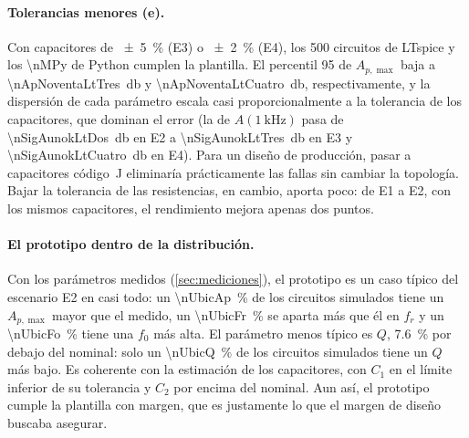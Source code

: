 \begin{table}[H]
  \centering\small
  \caption{Desviación estándar de los parámetros en el escenario E2 (R $\pm\qty{1}{\percent}$, C $\pm\qty{10}{\percent}$): predicción lineal
  (\cref{eq:sigma_lineal}), Monte Carlo de Python con \num{\nMPy} muestras y con los mismos 500 juegos de componentes de LTspice, y LTspice.
  Frecuencias y $Q$ en porcentaje del valor nominal.}
  \label{tab:mc_dispersion}
\end{table}

\paragraph{Tolerancias menores (e).} Con capacitores de \qty{\pm 5}{\percent} (E3) o \qty{\pm 2}{\percent} (E4), los 500 circuitos de LTspice y los
\num{\nMPy} de Python cumplen la plantilla. El percentil 95 de $A_{p,\max}$ baja a \qty{\nApNoventaLtTres}{\decibel} y
\qty{\nApNoventaLtCuatro}{\decibel}, respectivamente, y la dispersión de cada parámetro escala casi proporcionalmente a la tolerancia de los
capacitores, que dominan el error (la de $A(\qty{1}{\kilo\hertz})$ pasa de \qty{\nSigAunokLtDos}{\decibel} en E2 a \qty{\nSigAunokLtTres}{\decibel}
en E3 y \qty{\nSigAunokLtCuatro}{\decibel} en E4). Para un diseño de producción, pasar a capacitores código~J eliminaría prácticamente las fallas
sin cambiar la topología. Bajar la tolerancia de las resistencias, en cambio, aporta poco: de E1 a E2, con los mismos capacitores, el rendimiento
mejora apenas dos puntos.

\paragraph{El prototipo dentro de la distribución.} Con los parámetros medidos (\cref{sec:mediciones}), el prototipo es un caso
típico del escenario E2 en casi todo: un \qty{\nUbicAp}{\percent} de los circuitos simulados tiene un $A_{p,\max}$ mayor que el medido, un
\qty{\nUbicFr}{\percent} se aparta más que él en $f_r$ y un \qty{\nUbicFo}{\percent} tiene una $f_0$ más alta. El parámetro menos típico es $Q$,
\qty{7.6}{\percent} por debajo del nominal: solo un \qty{\nUbicQ}{\percent} de los circuitos simulados tiene un $Q$ más bajo. Es coherente con la
estimación de los capacitores, con $C_1$ en el límite inferior de su tolerancia y $C_2$ por encima del nominal. Aun así, el prototipo cumple la
plantilla con margen, que es justamente lo que el margen de diseño buscaba asegurar.


